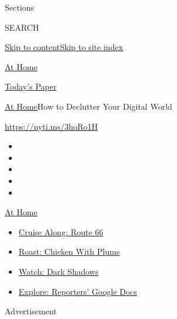 Sections

SEARCH

\protect\hyperlink{site-content}{Skip to
content}\protect\hyperlink{site-index}{Skip to site index}

\href{https://www.nytimes3xbfgragh.onion/spotlight/at-home}{At Home}

\href{https://myaccount.nytimes3xbfgragh.onion/auth/login?response_type=cookie\&client_id=vi}{}

\href{https://www.nytimes3xbfgragh.onion/section/todayspaper}{Today's
Paper}

\href{/spotlight/at-home}{At Home}\textbar{}How to Declutter Your
Digital World

\url{https://nyti.ms/3hoRo1H}

\begin{itemize}
\item
\item
\item
\item
\item
\end{itemize}

\href{https://www.nytimes3xbfgragh.onion/spotlight/at-home?action=click\&pgtype=Article\&state=default\&region=TOP_BANNER\&context=at_home_menu}{At
Home}

\begin{itemize}
\tightlist
\item
  \href{https://www.nytimes3xbfgragh.onion/2020/09/07/travel/route-66.html?action=click\&pgtype=Article\&state=default\&region=TOP_BANNER\&context=at_home_menu}{Cruise
  Along: Route 66}
\item
  \href{https://www.nytimes3xbfgragh.onion/2020/09/04/dining/sheet-pan-chicken.html?action=click\&pgtype=Article\&state=default\&region=TOP_BANNER\&context=at_home_menu}{Roast:
  Chicken With Plums}
\item
  \href{https://www.nytimes3xbfgragh.onion/2020/09/04/arts/television/dark-shadows-stream.html?action=click\&pgtype=Article\&state=default\&region=TOP_BANNER\&context=at_home_menu}{Watch:
  Dark Shadows}
\item
  \href{https://www.nytimes3xbfgragh.onion/interactive/2020/at-home/even-more-reporters-editors-diaries-lists-recommendations.html?action=click\&pgtype=Article\&state=default\&region=TOP_BANNER\&context=at_home_menu}{Explore:
  Reporters' Google Docs}
\end{itemize}

Advertisement

